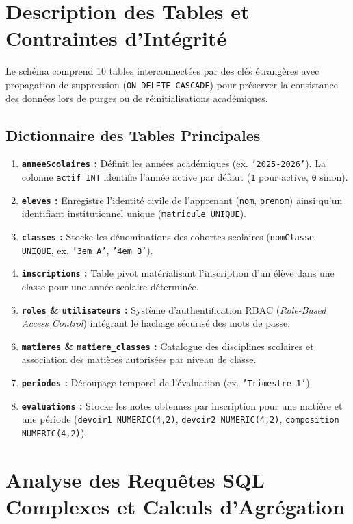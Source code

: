 \documentclass[11pt,a4paper,oneside]{report}
\begin{document}
\section{Description des Tables et Contraintes d'Intégrité}

Le schéma comprend 10 tables interconnectées par des clés étrangères avec propagation de suppression (\texttt{ON DELETE CASCADE}) pour préserver la consistance des données lors de purges ou de réinitialisations académiques.

\subsection{Dictionnaire des Tables Principales}
\begin{enumerate}
    \item \textbf{\texttt{anneeScolaires} :} Définit les années académiques (ex. \texttt{'2025-2026'}). La colonne \texttt{actif INT} identifie l'année active par défaut (\texttt{1} pour active, \texttt{0} sinon).
    \item \textbf{\texttt{eleves} :} Enregistre l'identité civile de l'apprenant (\texttt{nom}, \texttt{prenom}) ainsi qu'un identifiant institutionnel unique (\texttt{matricule UNIQUE}).
    \item \textbf{\texttt{classes} :} Stocke les dénominations des cohortes scolaires (\texttt{nomClasse UNIQUE}, ex. \texttt{'3em A'}, \texttt{'4em B'}).
    \item \textbf{\texttt{inscriptions} :} Table pivot matérialisant l'inscription d'un élève dans une classe pour une année scolaire déterminée.
    \item \textbf{\texttt{roles} \& \texttt{utilisateurs} :} Système d'authentification RBAC (\textit{Role-Based Access Control}) intégrant le hachage sécurisé des mots de passe.
    \item \textbf{\texttt{matieres} \& \texttt{matiere\_classes} :} Catalogue des disciplines scolaires et association des matières autorisées par niveau de classe.
    \item \textbf{\texttt{periodes} :} Découpage temporel de l'évaluation (ex. \texttt{'Trimestre 1'}).
    \item \textbf{\texttt{evaluations} :} Stocke les notes obtenues par inscription pour une matière et une période (\texttt{devoir1 NUMERIC(4,2)}, \texttt{devoir2 NUMERIC(4,2)}, \texttt{composition NUMERIC(4,2)}).
\end{enumerate}

\section{Analyse des Requêtes SQL Complexes et Calculs d'Agrégation}
\end{document}
